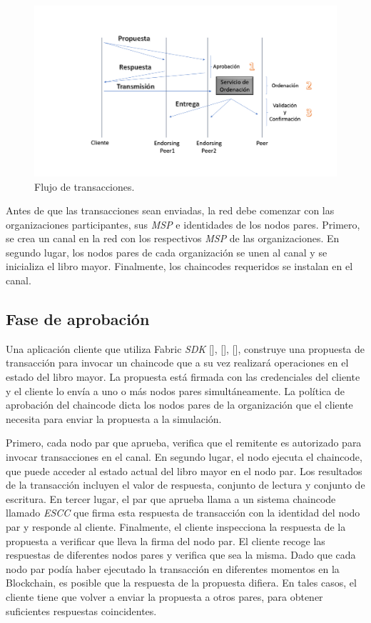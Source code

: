 \begin{figure}[h]
\centering
\includegraphics[width=0.6\linewidth]{Graphics/FlujoTransacciones.png}
\caption{Flujo de transacciones.}
\label{FlujoTransacciones}
\end{figure}

\vspace{1 cm}
Antes de que las transacciones sean enviadas, la red debe comenzar con las organizaciones participantes, sus \emph{MSP} e identidades de los nodos pares. Primero, se crea un canal en la red con los respectivos \emph{MSP} de las organizaciones. En segundo lugar, los nodos pares de cada organizaci\'on se unen al canal y se inicializa el libro mayor. Finalmente, los chaincodes requeridos se instalan en el canal.


\subsection{Fase de aprobaci\'on}
Una aplicaci\'on cliente que utiliza Fabric \emph{SDK} [\cite{Go-SDK}], [\cite{Node-SDK}], [\cite{Java-SDK}], construye una propuesta de transacci\'on para invocar un chaincode que a su vez realizar\'a operaciones en el estado del libro mayor. La propuesta est\'a firmada con las credenciales del cliente y el cliente lo env\'ia a uno o m\'as nodos pares simult\'aneamente. La pol\'itica de aprobaci\'on del chaincode dicta los nodos pares de la organizaci\'on que el cliente necesita para enviar la propuesta a la simulaci\'on. 

Primero, cada nodo par que aprueba, verifica que el remitente es autorizado para invocar transacciones en el canal. En segundo lugar, el nodo ejecuta el chaincode, que puede acceder al estado actual del libro mayor en el nodo par. Los resultados de la transacci\'on incluyen el valor de respuesta, conjunto de lectura y conjunto de escritura. En tercer lugar, el par que aprueba llama a un sistema chaincode llamado \emph{ESCC} que firma esta respuesta de transacci\'on con la identidad del nodo par y responde al cliente. Finalmente, el cliente inspecciona la respuesta de la propuesta a verificar que lleva la firma del nodo par. El cliente recoge las respuestas de diferentes nodos pares y verifica que sea la misma. Dado que cada nodo par pod\'ia haber ejecutado la transacci\'on en diferentes momentos en la Blockchain, es posible que la respuesta de la propuesta difiera. En tales casos, el cliente tiene que volver a enviar la propuesta a otros pares, para obtener suficientes respuestas coincidentes.

